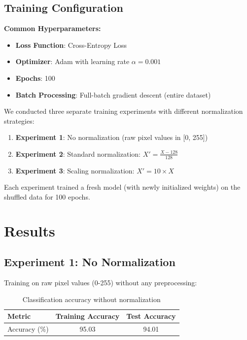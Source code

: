 \documentclass[11pt,a4paper]{article}
\begin{document}
\subsection{Training Configuration}

\textbf{Common Hyperparameters:}
\begin{itemize}
    \item \textbf{Loss Function}: Cross-Entropy Loss
    \item \textbf{Optimizer}: Adam with learning rate $\alpha = 0.001$
    \item \textbf{Epochs}: 100
    \item \textbf{Batch Processing}: Full-batch gradient descent (entire dataset)
\end{itemize}

We conducted three separate training experiments with different normalization strategies:

\begin{enumerate}
    \item \textbf{Experiment 1}: No normalization (raw pixel values in [0, 255])
    \item \textbf{Experiment 2}: Standard normalization: $X' = \frac{X - 128}{128}$ 
    \item \textbf{Experiment 3}: Scaling normalization: $X' = 10 \times X$
\end{enumerate}

Each experiment trained a fresh model (with newly initialized weights) on the shuffled data for 100 epochs.

\section{Results}

\subsection{Experiment 1: No Normalization}

Training on raw pixel values (0-255) without any preprocessing:

\begin{table}[H]
\centering
\begin{tabular}{@{}lcc@{}}
\toprule
\textbf{Metric} & \textbf{Training Accuracy} & \textbf{Test Accuracy} \\ 
\midrule
Accuracy (\%) & 95.03 & 94.01 \\
\bottomrule
\end{tabular}
\caption{Classification accuracy without normalization}
\label{tab:exp1}
\end{table}
\end{document}
